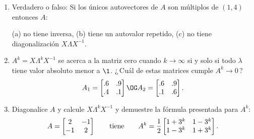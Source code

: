 \begin{enumerate}
\item Verdadero o falso: Si los únicos autovectores de $A$ son  múltiplos de $(1,4)$ entonces $A$:

\vspace{6pt}
\centerline{(a) no tiene inversa,\qquad
(b) tiene un autovalor repetido,\qquad
(c) no tiene diagonalización $X\Lambda X^{-1}$.}


\item $A^k=X\Lambda^k X^{-1}$ se acerca a la matriz cero cuando $k\to\infty$ si y solo si todo  $\lambda$ tiene valor absoluto menor a $\1$. ¿\,Cuál de estas matrices cumple $A^k\to0$\,?
\begin{displaymath}
  A_1=\begin{bmatrix} .6&.9\\ .4&.1\end{bmatrix}\OG
  A_2=\begin{bmatrix} .6&.9\\ .1&.6\end{bmatrix}.
\end{displaymath}


\item Diagonalice $A$ y calcule $X\Lambda^k X^{-1}$ y demuestre la fórmula presentada para $A^k$:
\begin{displaymath}
  A=\begin{bmatrix} 2 & -1\\
    -1 & 2\end{bmatrix}
    \qquad\hbox{tiene}\qquad
  A^k=\dfrac12\begin{bmatrix} 1+3^k & 1-3^k\\
    1-3^k & 1+3^k\end{bmatrix}.
\end{displaymath}


\end{enumerate}

